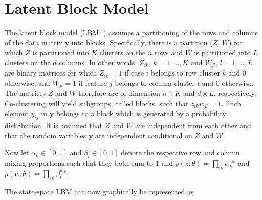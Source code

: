 \documentclass[10pt,a4paper]{article}
\begin{document}
\section{Latent Block Model}
The latent block model (LBM; \cite{govaert2003clustering}) assumes a partitioning of the rows and columns of the data matrix $\mathbf{y}$ into blocks. Specifically, there is a partition ($Z$, $W$) for which $Z$ is partitioned into $K$ clusters on the $n$ rows and $W$ is partitioned into $L$ clusters on the $d$ columns. In other words, $Z_{ik}$, $k = 1,..., K$ and $W_{jl}$, $l = 1,..., L$ are binary matrices for which $Z_{ik} = 1$ if case $i$ belongs to row cluster $k$ and $0$ otherwise, and $W_{jl} = 1$ if feature $j$ belongs to column cluster $l$ and $0$ otherwise. The matrices $Z$ and $W$ therefore are of dimension $n \times K$ and $d \times L$, respectively. Co-clustering will yield subgroups, called blocks, such that $z_{ik} w_{jl} = 1$. Each element $y_{ij}$ in $\mathbf{y}$ belongs to a block which is generated by a probability distribution. It is assumed that $Z$ and $W$ are independent from each other and that the random variables $\mathbf{y}$ are independent conditional on $Z$ and $W$.

Now let $\alpha_k \in [0,1]$ and $\beta_l \in [0,1]$ denote the respective row and column mixing proportions such that they both sum to 1 and 
%
$
p(z; \theta) = \prod_{ik} \alpha_k^{z_{ik}} 
$
%
and 
%
$
p(w; \theta) = \prod_{ik} \beta_l^{w_{jl}}. 
$ 
%

The state-space LBM can now graphically be represented as

\begin{figure}[H]
	\centering
\end{figure}	
\end{document}
